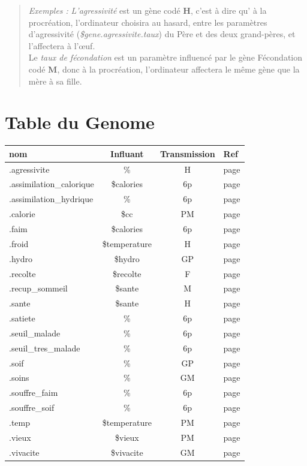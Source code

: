 \documentclass[french]{report}
\newlength{\du}\fi
\begin{document}
\begin{itemize}
	\begin{quote}
		\textit{Exemples : }
		\textit{L'agressivité} est un gène codé \textbf{H}, c'est à dire qu' à la procréation, l'ordinateur choisira au hasard, entre les paramètres d'agressivité (\textit{\$gene.agressivite.taux}) du Père et des deux grand-pères, et l'affectera à l’œuf.\\
		
		Le \textit{taux de fécondation} est un paramètre influencé par le gène Fécondation codé \textbf{M}, donc à la procréation, l'ordinateur affectera le même gène que la mère à sa fille.\\		
	\end{quote}
\end{itemize}
\section{Table du Genome}\label{liste_gene}
\begin{center}
\begin{tabular}{|l|c|c|l|}\hline
\rowcolor{green}\textbf{nom}  & \textbf{Influant} & \textbf{\small{Transmission}} & \textbf{Ref}\\ \hline

.agressivite & \% & H & page \pageref{agressivite} \\ \hline
.assimilation\_calorique & \$calories & 6p & page \pageref{nourrir} \\ \hline
.assimilation\_hydrique & \% & 6p & page \pageref{hydro} \\ \hline
.calorie & \$cc  & PM & page \pageref{cc} \\ \hline
.faim  & \$calories & 6p & page \pageref{faim} \\ \hline
.froid & \$temperature & H & page \pageref{froid} \\ \hline
.hydro & \$hydro & GP & page \pageref{hydro} \\ \hline
.recolte & \$recolte & F & page \pageref{param_action}\\ \hline
.recup\_sommeil & \$sante & M & page \pageref{sante}\\ \hline
.sante  & \$sante & H &  page \pageref{sante}\\ \hline
.satiete & \% & 6p & page \pageref{nourrir}\\ \hline
.seuil\_malade & \% & 6p & page \pageref{sante}\\ \hline
.seuil\_tres\_malade & \% & 6p & page \pageref{sante}\\ \hline
.soif & \% & GP & page \pageref{soif} \\ \hline
.soins & \% & GM & page \pageref{repos} \\ \hline
.souffre\_faim & \% & 6p & page \pageref{faim} \\ \hline
.souffre\_soif & \% & 6p & page \pageref{soif} \\ \hline
.temp & \$temperature & PM & page \pageref{temperature} \\ \hline
.vieux & \$vieux & PM & page \pageref{vieillesse} \\ \hline
.vivacite & \$vivacite & GM & page \pageref{vivacite} \\ \hline
\end{tabular}
\end{center}
\end{document}
